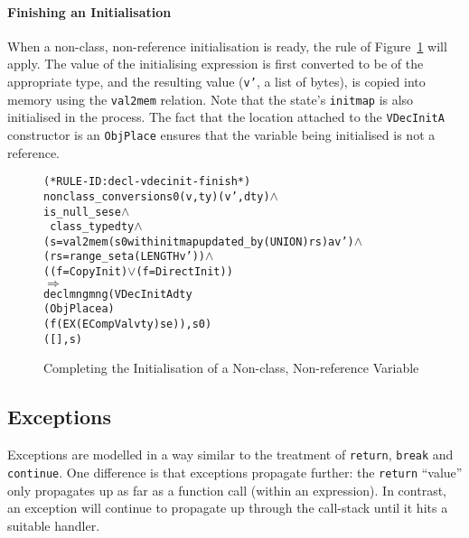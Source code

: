 \documentclass[11pt]{article}
\begin{document}
\paragraph{Finishing an Initialisation}
When a non-class, non-reference initialisation is ready, the rule
 of Figure~\ref{fig:decl-vdecinit-finish}
will apply.  The value of the initialising expression is first
converted to be of the appropriate type, and the resulting value
(\texttt{v'}, a list of bytes), is copied into memory using the
\texttt{val2mem} relation.  Note that
the state's \texttt{initmap} is also initialised in the
process.  The fact that the location attached to the
\texttt{VDecInitA} constructor is an \texttt{ObjPlace} ensures that
the variable being initialised is not a reference.%
%
\begin{figure}
\begin{minipage}{\textwidth}
%
%
\begin{alltt}
(* RULE-ID: decl-vdecinit-finish *)
     nonclass_conversion s0 (v,ty) (v',dty) \(\land\)
     is_null_se se \(\land\)
     ~class_type dty \(\land\)
     (s = val2mem (s0 with initmap updated_by (UNION) rs) a v') \(\land\)
     (rs = range_set a (LENGTH v')) \(\land\)
     ((f = CopyInit) \(\lor\) (f = DirectInit))
   \(\Rightarrow\)
     declmng mng (VDecInitA dty
                            (ObjPlace a)
                            (f (EX (ECompVal v ty) se)), s0)
                 ([], s)
\end{alltt}
\end{minipage}
\caption[Finishing Initialisation of a Non-class, Non-reference
  Variable]{Completing the Initialisation of a Non-class, Non-reference
  Variable}
\label{fig:decl-vdecinit-finish}
\end{figure}

\subsection{Exceptions}
\label{sec:exceptions}
\newcommand{\ethrow}{\texttt{EThrow}}

Exceptions are modelled in a way similar to the treatment of
\texttt{return}, \texttt{break} and \texttt{continue}.  One difference
is that exceptions propagate further: the \texttt{return} ``value''
only propagates up as far as a function call (within an expression).
In contrast, an exception will continue to propagate up through the
call-stack until it hits a suitable handler.
\end{document}

